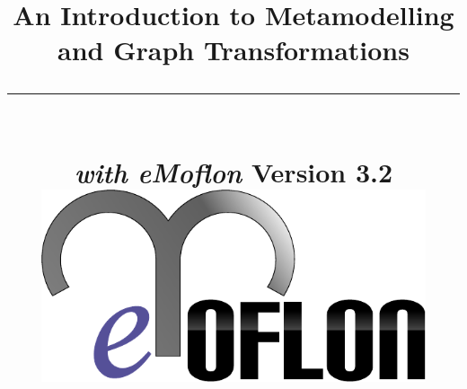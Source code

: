 \title{
\flushright
{\LARGE\bfseries An Introduction to Metamodelling\\
and Graph Transformations}
\noindent\rule[-1ex]{\textwidth}{5pt}\\[2.5ex]
\hfill\emph{\LARGE\bfseries with eMoflon}
\flushleft
{\small Version 3.2}
\flushright
\includegraphics[width=0.85\textwidth]{pics/eMoflon3} 
}

\date{}  
\author{} 